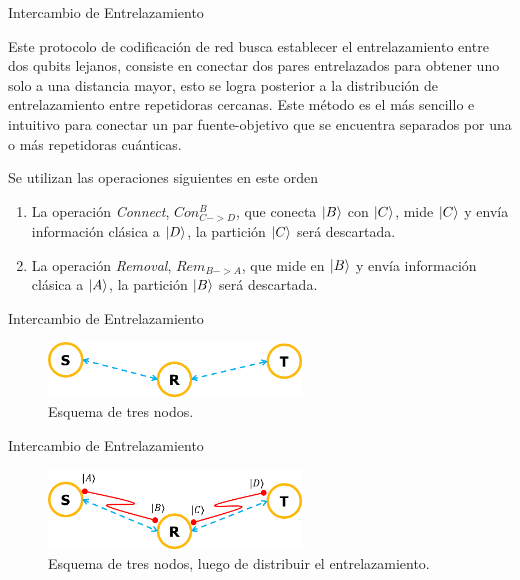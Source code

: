 \documentclass[10pt]{beamer}
\renewenvironment{block}[1]
    {\begin{oldblock}{#1}
        \smallskip
    }
    {
    \end{oldblock}
    }
\newcommand{\K}[1]{$\ket{#1}$}
\begin{document}
\begin{frame}{Intercambio de Entrelazamiento}
  \begin{block}{}
    Este protocolo de codificación de red busca establecer el entrelazamiento entre dos qubits lejanos, consiste en conectar dos pares entrelazados para obtener uno solo a una distancia mayor, esto se logra posterior a la distribución de entrelazamiento entre repetidoras cercanas. Este método es el más sencillo e intuitivo para conectar un par fuente-objetivo que se encuentra separados por una o más repetidoras cuánticas.
  \end{block}
  \begin{block}{Se utilizan las operaciones siguientes en este orden}
    \begin{enumerate}
      \item La operación \textit{Connect}, $Con^B_{C -> D}$, que conecta \K{B} con \K{C}, mide \K{C} y envía información clásica a \K{D}, la partición \K{C} será descartada.
      \item La operación \textit{Removal}, $Rem_{B -> A}$, que mide en \K{B} y envía información clásica a \K{A}, la partición \K{B} será descartada.
    \end{enumerate}

  \end{block}
\end{frame}
\begin{frame}{Intercambio de Entrelazamiento}
  \begin{block}{}
    \begin{figure}
      \includegraphics[width=0.6\textwidth]{Imagen1.png}
      \caption{Esquema de tres nodos.}
    \end{figure}
  \end{block}
\end{frame}
\begin{frame}{Intercambio de Entrelazamiento}
  \begin{block}{}
    \begin{figure}
      \includegraphics[width=0.6\textwidth]{Imagen2.png}
      \caption{Esquema de tres nodos, luego de distribuir el entrelazamiento.}
    \end{figure}
  \end{block}
\end{frame}
\end{document}
